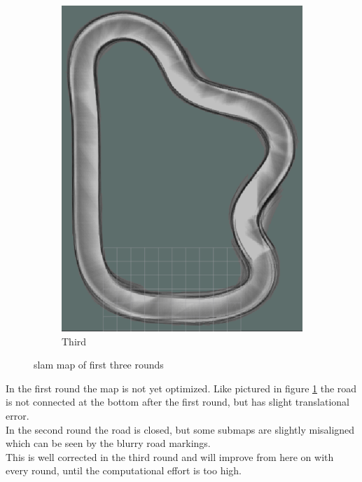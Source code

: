 \begin{figure}[H]
\begin{subfigure}{.3\linewidth}
		\includegraphics[width=\textwidth]{Pictures/1slamtest3}
		\caption{Third}
	\end{subfigure}

	\caption{slam map of first three rounds}
	\label{1slamtest}

\end{figure}

In the first round the map is not yet optimized. Like pictured in  figure \ref{1slamtest} the road is not connected at the bottom after the first round, but has slight translational error.\\
In the second round the road is closed, but some submaps are slightly misaligned which can be seen by the blurry road markings.\\
This is well corrected in the third round and will improve from here on with every round, until the computational effort is too high.\\

